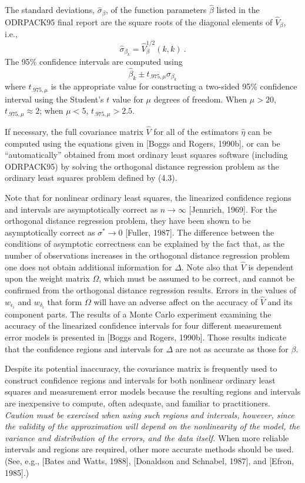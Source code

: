 \noindent The standard deviations, $\hat{\sigma}_\beta$, of the function
parameters $\hat{\beta}$ listed in the ODRPACK95 final report are the square roots of the diagonal elements of $\hat{V}_\beta$, i.e.,
$$\hat{\sigma}_{\beta_k}=\hat{V}_\beta^{1/2}(k,k)\ .$$
The 95\% confidence intervals are computed using
$$\hat{\beta}_k\pm t_{.975,\mu}\hat{\sigma}_{\beta_k}$$
where $t_{.975,\mu}$ is the appropriate value for constructing a two-sided 95\% confidence interval using the Student's $t$ value for $\mu$ degrees of freedom. When $\mu>20$, $t_{.975,\mu}\approx2$; when $\mu<5$, $t_{.975,\mu}>2.5$.

\noindent If necessary, the full covariance matrix $\hat{V}$ for all of the
estimators $\hat{\eta}$ can be computed using the equations given in [Boggs and
Rogers, 1990b], or can be ``automatically'' obtained from most ordinary least
squares software (including ODRPACK95) by solving the orthogonal distance regression problem as the ordinary least squares problem defined by (4.3).

\noindent Note that for nonlinear ordinary least squares, the linearized confidence regions and intervals are asymptotically correct as $n\rightarrow\infty$ [Jennrich, 1969]. For the orthogonal distance regression problem, they have been shown to be asymptotically correct as $\sigma^\ast\rightarrow0$ [Fuller, 1987]. The difference between the conditions of asymptotic correctness can be explained by the fact that, as the number of observations increases in the orthogonal distance regression problem one does not obtain additional information for $\Delta$. Note also that $\hat{V}$ is dependent upon the weight matrix $\Omega$, which must be assumed to be correct, and cannot be confirmed from the orthogonal distance regression results. Errors in the values of $w_{\epsilon_i}$ and
$w_{\delta_i}$ that form $\Omega$ will have an adverse affect on the accuracy of $\hat{V}$ and its component parts. The results of a Monte Carlo experiment examining the accuracy of the linearized confidence intervals for four different measurement error models is presented in [Boggs and Rogers, 1990b]. Those results indicate that the confidence regions and intervals for $\Delta$ are not as accurate as those for $\beta$.

\noindent Despite its potential inaccuracy, the covariance matrix is frequently used to construct confidence regions and intervals for both nonlinear ordinary least squares and measurement error models because the resulting regions and intervals are inexpensive to compute, often adequate, and familiar to practitioners. {\it Caution must be exercised when using such regions and intervals, however, since the validity of the approximation will depend on the nonlinearity of the model, the variance and distribution of the errors, and the data itself.} When more reliable intervals and regions are required, other more accurate methods should be used. (See, e.g., [Bates and Watts, 1988], [Donaldson and Schnabel, 1987], and [Efron, 1985].)

